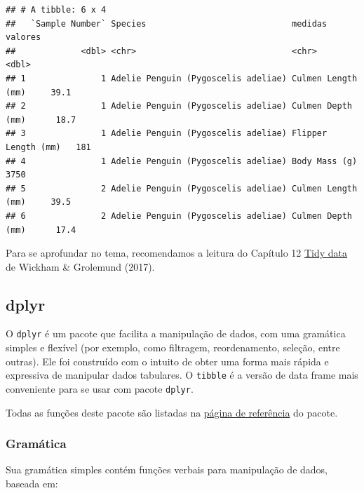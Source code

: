 \documentclass[
]{article}
\begin{document}
\begin{verbatim}
## # A tibble: 6 x 4
##   `Sample Number` Species                             medidas             valores
##             <dbl> <chr>                               <chr>                 <dbl>
## 1               1 Adelie Penguin (Pygoscelis adeliae) Culmen Length (mm)     39.1
## 2               1 Adelie Penguin (Pygoscelis adeliae) Culmen Depth (mm)      18.7
## 3               1 Adelie Penguin (Pygoscelis adeliae) Flipper Length (mm)   181  
## 4               1 Adelie Penguin (Pygoscelis adeliae) Body Mass (g)        3750  
## 5               2 Adelie Penguin (Pygoscelis adeliae) Culmen Length (mm)     39.5
## 6               2 Adelie Penguin (Pygoscelis adeliae) Culmen Depth (mm)      17.4
\end{verbatim}

Para se aprofundar no tema, recomendamos a leitura do Capítulo 12 \href{https://r4ds.had.co.nz/tidy-data.html}{Tidy data} de Wickham \& Grolemund (2017).

\hypertarget{dplyr}{%
\subsection{dplyr}\label{dplyr}}

O \texttt{dplyr} é um pacote que facilita a manipulação de dados, com uma gramática simples e flexível (por exemplo, como filtragem, reordenamento, seleção, entre outras). Ele foi construído com o intuito de obter uma forma mais rápida e expressiva de manipular dados tabulares. O \texttt{tibble} é a versão de data frame mais conveniente para se usar com pacote \texttt{dplyr}.

Todas as funções deste pacote são listadas na \href{https://dplyr.tidyverse.org/reference/index.html}{página de referência} do pacote.

\hypertarget{gramuxe1tica}{%
\subsubsection{Gramática}\label{gramuxe1tica}}

Sua gramática simples contém funções verbais para manipulação de dados, baseada em:
\end{document}

